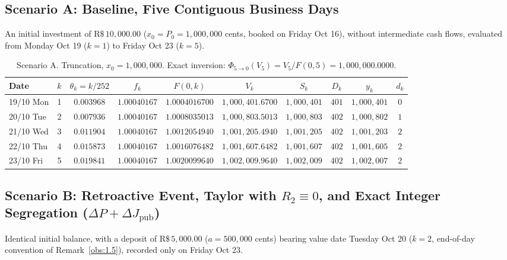 \documentclass[11pt, a4paper]{article}
\theoremstyle{definition}
\theoremstyle{plain}
\theoremstyle{remark}
\begin{document}
\subsection{Scenario A: Baseline, Five Contiguous Business Days}\label{sec:7.1}

An initial investment of $\text{R\$}\,10,000.00$ ($x_0 = P_0 = 1,000,000$ cents, booked on Friday Oct 16), without intermediate cash flows, evaluated from Monday Oct 19 ($k=1$) to Friday Oct 23 ($k=5$).

\begin{table}[htbp]
\centering
\footnotesize
\setlength{\tabcolsep}{3.8pt}
\begin{tabular}{@{}lcclcccccc@{}}
\toprule
\textbf{Date} & $k$ & $\theta_k = k/252$ & \multicolumn{1}{c}{$f_k$} & $F(0,k)$ & $V_k$ & $S_k$ & $D_k$ & $y_k$ & $d_k$ \\
\midrule
19/10 Mon & 1 & $0.003968$ & $1.00040167$ & $1.0004016700$ & $1,000,401.6700$ & $1,000,401$ & $401$ & $1,000,401$ & $0$ \\
20/10 Tue & 2 & $0.007936$ & $1.00040167$ & $1.0008035013$ & $1,000,803.5013$ & $1,000,803$ & $402$ & $1,000,802$ & $1$ \\
21/10 Wed & 3 & $0.011904$ & $1.00040167$ & $1.0012054940$ & $1,001,205.4940$ & $1,001,205$ & $402$ & $1,001,203$ & $2$ \\
22/10 Thu & 4 & $0.015873$ & $1.00040167$ & $1.0016076482$ & $1,001,607.6482$ & $1,001,607$ & $402$ & $1,001,605$ & $2$ \\
23/10 Fri & 5 & $0.019841$ & $1.00040167$ & $1.0020099640$ & $1,002,009.9640$ & $1,002,009$ & $402$ & $1,002,007$ & $2$ \\
\bottomrule
\end{tabular}
\caption{Scenario A. Truncation, $x_0 = 1,000,000$. Exact inversion: $\Phi_{5 \to 0}(V_5) = V_5 / F(0,5) = 1,000,000.0000$.}
\label{tab:6}
\end{table}

\subsection{Scenario B: Retroactive Event, Taylor with \texorpdfstring{$R_2 \equiv 0$}{R2 = 0}, and Exact Integer Segregation \texorpdfstring{($\Delta P + \Delta J_{\text{pub}}$)}{(Delta P + Delta J)}}\label{sec:7.2}

Identical initial balance, with a deposit of $\text{R\$}\,5,000.00$ ($a = 500,000$ cents) bearing value date Tuesday Oct 20 ($k=2$, end-of-day convention of Remark~\ref{obs:1.5}), recorded only on Friday Oct 23.
\end{document}
